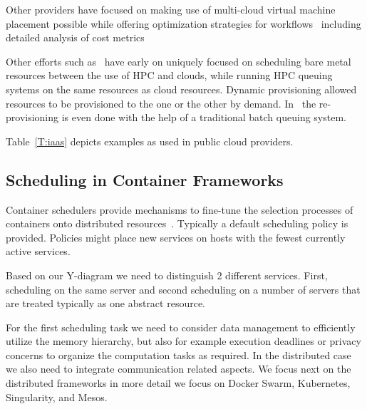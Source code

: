 \documentclass[final,5p,times,twocolumn]{elsarticle}
\begin{document}
Other providers have focused on making use of multi-cloud virtual
machine placement possible while offering optimization strategies for
workflows~\cite{CloudSigma2016} including detailed analysis of cost
metrics~\cite{Cloudmetrics2019}

Other efforts such as~\cite{las12fg-bookchapter,fox2013futuregrid}
have early on uniquely focused on scheduling bare metal resources
between the use of HPC and clouds, while running HPC queuing systems
on the same resources as cloud resources. Dynamic provisioning allowed
resources to be provisioned to the one or the other by
demand. In~\cite{las-comet} the re-provisioning is even done with the
help of a traditional batch queuing system.

Table~\ref{T:iaas} depicts examples as used in public cloud providers.






\subsection{Scheduling in Container Frameworks}
\label{sec:container}


Container schedulers provide mechanisms to fine-tune the selection
processes of containers onto distributed
resources~\cite{Containers2018,de2018distributed}. Typically a default
scheduling policy is provided. Policies might place new services on
hosts with the fewest currently active services.

Based on our Y-diagram we need to distinguish 2 different
services. First, scheduling on the same server and second scheduling
on a number of servers that are treated typically as one abstract
resource.

For the first scheduling task we need to consider data management to
efficiently utilize the memory hierarchy, but also for example
execution deadlines or privacy concerns to organize the computation
tasks as required. In the distributed case we also need to integrate
communication related aspects. We focus next on the distributed
frameworks in more detail we focus on Docker Swarm, Kubernetes,
Singularity, and Mesos.
\end{document}
